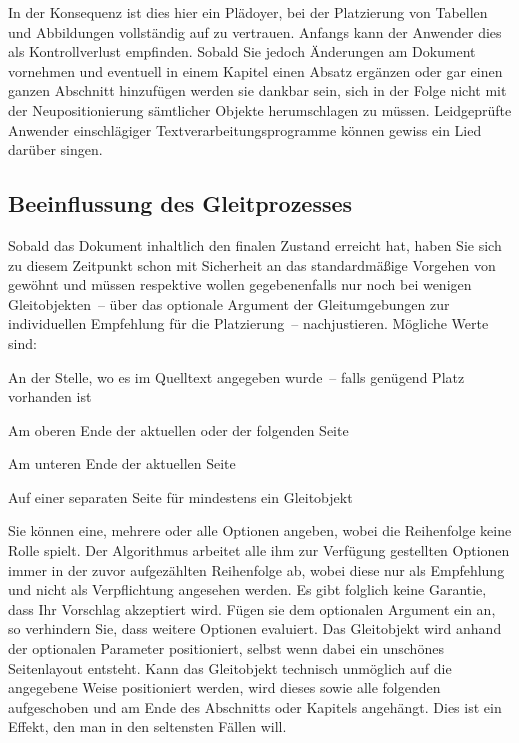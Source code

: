 \documentclass[%
  english,ngerman,%
  geometry=no,DIV=12,automark,%
]{tudscrartcl}
\begin{document}
\InputCode
%
In der Konsequenz ist dies hier ein Plädoyer, bei der Platzierung von Tabellen 
und Abbildungen vollständig auf  zu vertrauen. Anfangs kann der 
Anwender dies als Kontrollverlust empfinden. Sobald Sie jedoch Änderungen am 
Dokument vornehmen und eventuell in einem Kapitel einen Absatz ergänzen oder 
gar einen ganzen Abschnitt hinzufügen werden sie dankbar sein, sich in der 
Folge nicht mit der Neupositionierung sämtlicher Objekte herumschlagen zu 
müssen. Leidgeprüfte Anwender einschlägiger Textverarbeitungsprogramme können 
gewiss ein Lied darüber singen.



\subsection{Beeinflussung des Gleitprozesses}
Sobald das Dokument inhaltlich den finalen Zustand erreicht hat, haben Sie sich 
zu diesem Zeitpunkt schon mit Sicherheit an das standardmäßige Vorgehen von 
 gewöhnt und müssen respektive wollen gegebenenfalls nur noch bei 
wenigen Gleitobjekten~-- über das optionale Argument der Gleitumgebungen zur
individuellen Empfehlung für die Platzierung~-- nachjustieren. Mögliche Werte 
sind:
%
\begin{description}[labelindent=\parindent,leftmargin=*,style=nextline]
\item[\POParameter{h} (here)]
  An der Stelle, wo es im Quelltext angegeben wurde~-- falls genügend Platz 
  vorhanden ist
\item[\POParameter{t} (top)]
  Am oberen Ende der aktuellen oder der folgenden Seite
\item[\POParameter{b} (bottom)]
  Am unteren Ende der aktuellen Seite
\item[\POParameter{p} (page)]
  Auf einer separaten Seite für mindestens ein Gleitobjekt
\end{description}
%
Sie können eine, mehrere oder alle Optionen angeben, wobei die Reihenfolge 
keine Rolle spielt. Der Algorithmus arbeitet alle ihm zur Verfügung gestellten 
Optionen immer in der zuvor aufgezählten Reihenfolge ab, wobei diese nur als 
Empfehlung und nicht als Verpflichtung angesehen werden. Es gibt folglich keine 
Garantie, dass Ihr Vorschlag akzeptiert wird. Fügen sie dem optionalen Argument 
ein \PValue{!} an, so verhindern Sie, dass  weitere Optionen 
evaluiert. Das Gleitobjekt wird anhand der optionalen Parameter positioniert, 
selbst wenn dabei ein unschönes Seitenlayout entsteht. Kann das Gleitobjekt 
technisch unmöglich auf die angegebene Weise positioniert werden, wird dieses 
sowie alle folgenden aufgeschoben und am Ende des Abschnitts oder Kapitels 
angehängt. Dies ist ein Effekt, den man in den seltensten Fällen will. 
\end{document}
